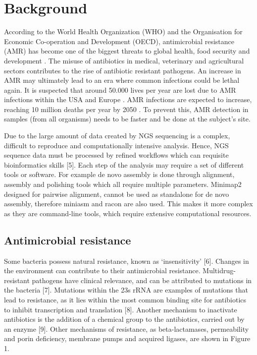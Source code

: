 \documentclass[a4paper,num-refs]{oup-contemporary}
\begin{document}
\section{Background}
According to the World Health Organization (WHO) and the Organisation for Economic Co-operation and Development (OECD), antimicrobial resistance (AMR) has become one of the biggest threats to global health, food security and development \cite{OrganisationforEconomicCo-operationandDevelopment2017, WorldHealthOrganization2018}. The misuse of antibiotics in medical, veterinary and agricultural sectors contributes to the rise of antibiotic resistant pathogens. An increase in AMR may ultimately lead to an era where common infections could be lethal again. It is suspected that around 50.000 lives per year are lost due to AMR infections within the USA and Europe \cite{Simlai2016}. AMR infections are expected to increase, reaching 10 million deaths per year by 2050 \cite{ONeil2014}. To prevent this, AMR detection in samples (from all organisms) needs to be faster and be done at the subject's site. 

Due to the large amount of data created by NGS sequencing is a complex, difficult to reproduce and computationally intensive analysis. Hence, NGS sequence data must be processed by refined workflows which can requisite bioinformatics skills [5]. Each step of the analysis may require a set of different tools or software. For example de novo assembly is done through alignment, assembly and polishing tools which all require multiple parameters. Minimap2 designed for pairwise alignment, cannot be used as standalone for de novo assembly, therefore miniasm and racon are also used. This makes it more complex as they are command-line tools, which require extensive computational resources. 

\subsection{Antimicrobial resistance}
Some bacteria possess natural resistance, known as ‘insensitivity’ [6]. Changes in the environment can contribute to their antimicrobial resistance. Multidrug-resistant pathogens have clinical relevance, and can be attributed to mutations in the bacteria [7]. Mutations within the 23s rRNA are examples of mutations that lead to resistance, as it lies within the most common binding site for antibiotics to inhibit transcription and translation [8]. Another mechanism to inactivate antibiotics is the addition of a chemical group to the antibiotics, carried out by an enzyme [9]. Other mechanisms of resistance, as beta-lactamases, permeability and porin deficiency, membrane pumps and acquired ligases, are shown in Figure 1.
\end{document}
